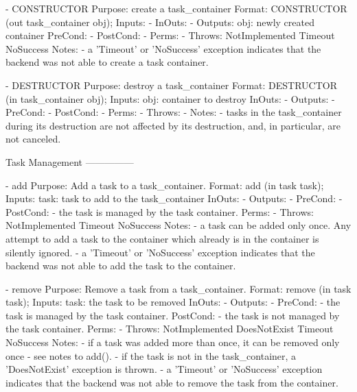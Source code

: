  
 \begin{myspec}
    - CONSTRUCTOR
      Purpose:  create a task_container
      Format:   CONSTRUCTOR          (out task_container obj);
      Inputs:   -
      InOuts:   -
      Outputs:  obj:                  newly created container
      PreCond:  -
      PostCond: -
      Perms:    -
      Throws:   NotImplemented
                Timeout
                NoSuccess
      Notes:    - a 'Timeout' or 'NoSuccess' exception indicates
                  that the backend was not able to create a task
                  container.
 
 
    - DESTRUCTOR
      Purpose:  destroy a task_container
      Format:   DESTRUCTOR           (in task_container obj);
      Inputs:   obj:                  container to destroy
      InOuts:   -
      Outputs:  -
      PreCond:  -
      PostCond: -
      Perms:    -
      Throws:   -
      Notes:    - tasks in the task_container during its
                  destruction are not affected by its
                  destruction, and, in particular, are not
                  canceled.
 
 
    Task Management
    ---------------
 
    - add
      Purpose:  Add a task to a task_container.
      Format:   add                  (in  task task);
      Inputs:   task:                 task to add to the
                                      task_container
      InOuts:   -
      Outputs:  -
      PreCond:  -
      PostCond: - the task is managed by the task container.
      Perms:    -
      Throws:   NotImplemented
                Timeout
                NoSuccess
      Notes:    - a task can be added only once.  Any attempt 
                  to add a task to the container which already 
                  is in the container is silently ignored.
                - a 'Timeout' or 'NoSuccess' exception indicates
                  that the backend was not able to add the task
                  to the container.
 
 
    - remove
      Purpose:  Remove a task from a task_container.
      Format:   remove               (in  task task);
      Inputs:   task:                 the task to be removed
      InOuts:   -
      Outputs:  -
      PreCond:  - the task is managed by the task container.
      PostCond: - the task is not managed by the task container.
      Perms:    -
      Throws:   NotImplemented
                DoesNotExist
                Timeout
                NoSuccess
      Notes:    - if a task was added more than once, it can be
                  removed only once - see notes to add().
                - if the task is not in the task_container, a 
                  'DoesNotExist' exception is thrown.
                - a 'Timeout' or 'NoSuccess' exception indicates
                  that the backend was not able to remove the 
                  task from the container.
 

\end{myspec}
